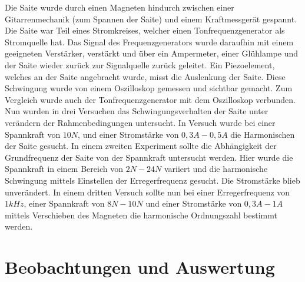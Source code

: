 \documentclass[11pt, a4Paper]{article}
\begin{document}
Die Saite wurde durch einen Magneten hindurch zwischen einer Gitarrenmechanik (zum Spannen der Saite) und einem Kraftmessgerät gespannt. Die Saite war Teil eines Stromkreises, welcher einen Tonfrequenzgenerator als Stromquelle hat. Das Signal des Frequenzgenerators wurde daraufhin mit einem geeigneten Verstärker, verstärkt und über ein Ampermeter, einer Glühlampe und der Saite wieder zurück zur Signalquelle zurück geleitet. Ein Piezoelement, welches an der Saite angebracht wurde, misst die Auslenkung der Saite. Diese Schwingung wurde von einem Oszilloskop gemessen und sichtbar gemacht. Zum Vergleich wurde auch der Tonfrequenzgenerator mit dem Oszilloskop verbunden. Nun wurden in drei Versuchen das Schwingungsverhalten der Saite unter verändern der Rahmenbedingungen untersucht. In Versuch wurde bei einer Spannkraft von $10N$, und einer Stromstärke von $0,3A-0,5A$ die Harmonischen der Saite gesucht. In einem zweiten Experiment sollte die Abhängigkeit der Grundfrequenz der Saite von der Spannkraft untersucht werden. Hier wurde die Spannkraft in einem Bereich von $2N-24N$ variiert und die harmonische Schwingung mittels Einstellen der Erregerfrequenz gesucht. Die Stromstärke blieb unverändert. In einem dritten Versuch sollte nun bei einer Erregerfrequenz von $1kHz$, einer Spannkraft von $8N-10N$ und einer Stromstärke von $0,3A-1A$ mittels Verschieben des Magneten die harmonische Ordnungszahl bestimmt werden.  

\newpage
\section{Beobachtungen und Auswertung}
\end{document}
